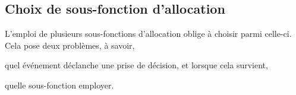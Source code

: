 \subsection{Choix de sous-fonction d'allocation}
\label{repl:subsec:allocationchoice}

L'emploi de plusieurs sous-fonctions d'allocation oblige à choisir parmi
celle-ci. Cela pose deux problèmes, à savoir,
\begin{inparaenum}[(i)]
\item quel événement déclanche une prise de décision, et lorsque cela survient, 
\item quelle sous-fonction employer.
\end{inparaenum}


